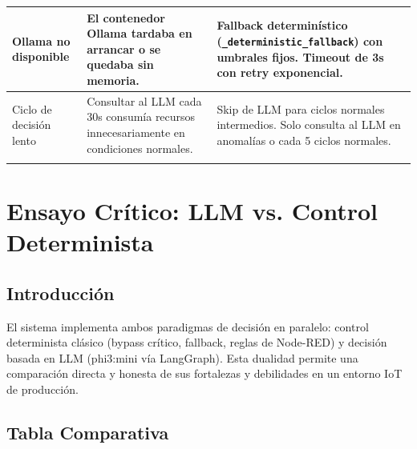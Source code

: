 \documentclass[12pt,letterpaper]{article}
\begin{document}
{\begin{longtable}{p{2.5cm}p{4.5cm}p{5cm}}
    \midrule
    Ollama no disponible & El contenedor Ollama tardaba en arrancar o se quedaba sin memoria. & Fallback determinístico (\mbox{\texttt{\_deterministic\_fallback}}) con umbrales fijos. Timeout de 3s con retry exponencial. \\
    \midrule
    Ciclo de decisión lento & Consultar al LLM cada 30s consumía recursos innecesariamente en condiciones normales. & Skip de LLM para ciclos normales intermedios. Solo consulta al LLM en anomalías o cada 5 ciclos normales. \\
    \bottomrule
    \label{tab:bitacora}
\end{longtable}
\setlength{\LTleft}{0pt}
\setlength{\LTright}{0pt}
}

\newpage

\section{Ensayo Crítico: LLM vs. Control Determinista}

\subsection{Introducción}

El sistema implementa ambos paradigmas de decisión en paralelo: control determinista clásico (bypass crítico, fallback, reglas de Node-RED) y decisión basada en LLM (phi3:mini vía LangGraph). Esta dualidad permite una comparación directa y honesta de sus fortalezas y debilidades en un entorno IoT de producción.

\subsection{Tabla Comparativa}
\end{document}
